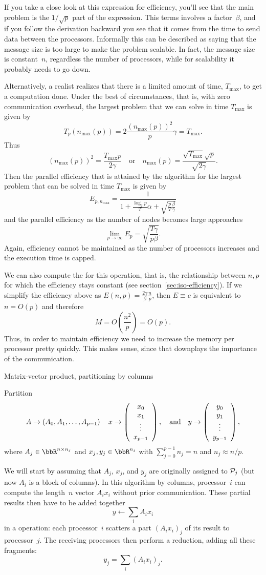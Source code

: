 If you take a close look at this expression for efficiency,
you'll see that the main problem is the $1/\sqrt p$ part of the
expression. This terms involves a factor~$\beta$, and if you follow
the derivation backward you see that it comes from the time to send
data between the processors. Informally this can be described as
saying that the message size is too large to make the problem
scalable. In fact, the message size is constant~$n$, regardless the
number of processors, while for scalability it probably needs to go down.

Alternatively, a realist realizes that there is a limited amount of time,
$ T_{\max} $, to get a computation done.
Under the best of circumstances, 
that is, with zero communication overhead, the largest problem
that we can solve in time $ T_{\max} $ is given by
\[ 
T_p(n_{\max}(p)) = 2 \frac{(n_{\max}(p))^2}{p} \gamma = T_{\max} .
\]
Thus
\[
(n_{\max}(p))^2 = \frac{T_{\max} p}{2 \gamma}
\quad
\mbox{or}
\quad
n_{\max}(p) = \frac{\sqrt{T_{\max}} \sqrt{p}}{\sqrt{2 \gamma}}.
\]
Then the parallel efficiency that is attained by the algorithm for the largest
problem that can be solved in time $ T_{\max} $ is given by
\[
  E_{p,n_{\max}}=\frac1
  {1+\frac{\log_2p}T\alpha+\sqrt{\frac pT\frac \beta\gamma}}
\]
and the parallel efficiency as the number of nodes becomes large approaches
\[
\lim_{p\rightarrow\infty}E_p= \sqrt{\frac{T\gamma}{p\beta}}.
\]
Again, efficiency cannot be maintained as the number of processors
increases and the execution time is capped.

We can also compute the  for this
operation, that is, the relationship between $n,p$ for which the
efficiency stays constant (see section~\ref{sec:iso-efficiency}). If
we simplify the efficiency above as
$E(n,p)=\frac{2\gamma}{\beta}\frac{n}{p}$, then $E\equiv c$ is
equivalent to $n=O(p)$ and therefore
\[ M=O\left(\frac{n^2}{p}\right)=O(p). \]
Thus, in order to maintain efficiency we need to increase the memory
per processor pretty quickly. This makes sense, since that downplays
the importance of the communication.

 {Matrix-vector product, partitioning by columns}

Partition
\[
A \rightarrow \left(A_0, A_1, \ldots, A_{p-1}\right) 
\quad
x \rightarrow \left( \begin{array}{c} x_0 \\ x_1 \\ \vdots \\ x_{p-1} \end{array} \right) ,
\quad
\mbox{and}
\quad
y \rightarrow \left( \begin{array}{c} y_0 \\ y_1 \\ \vdots \\ y_{p-1} \end{array} \right) ,
\]
where $ A_j \in \bbR^{n \times n_j} $ and $ x_j, y_j \in \bbR^{n_j} $ with
$ \sum_{j=0}^{p-1} n_j = n $ and $ n_j \approx n / p $.

We will start by assuming that $ A_j $, $ x_j $, and $ y_j $ are
originally assigned to $ {\cal P}_j $ (but now $ A_i $ is a block of
columns). In this algorithm by columns, processor~$i$ can compute the
length~$n$ vector $A_ix_i$ without prior communication. These partial
results then have to be added together
\[ y\leftarrow \sum_i A_ix_i \]
in a  operation: each processor~$i$ scatters
a part $(A_ix_i)_j$ of its result to processor~$j$. The receiving
processors then perform a reduction, adding all these fragments: 
\[ y_j = \sum_i (A_ix_i)_j. \]

